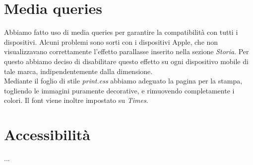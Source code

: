 \documentclass[12pt]{article}
\begin{document}
	\section{Media queries}
	Abbiamo fatto uso di media queries per garantire la compatibilità con tutti i dispositivi. Alcuni problemi sono sorti con i dispositivi Apple, che non visualizzavano correttamente l'effetto parallasse inserito nella sezione \textit{Storia}. Per questo abbiamo deciso di disabilitare questo effetto su ogni dispositivo mobile di tale marca, indipendentemente dalla dimensione.\\
	Mediante il foglio di stile \textit{print.css} abbiamo adeguato la pagina per la stampa, togliendo le immagini puramente decorative, e rimuovendo completamente i colori. Il font viene inoltre impostato su \textit{Times}.
	
		
	\section{Accessibilità}
	...	
	
	
	
\end{document}
